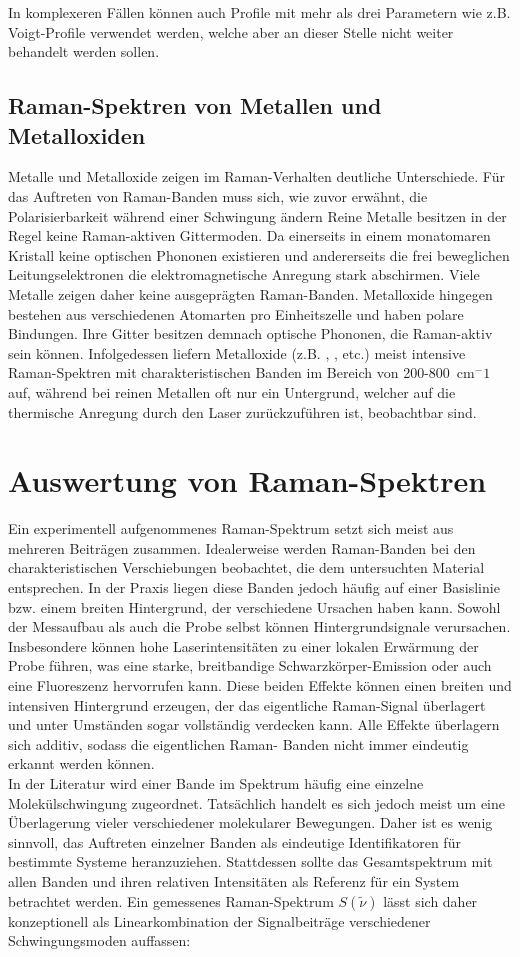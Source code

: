 In komplexeren Fällen können auch Profile mit mehr als drei Parametern wie z.B. Voigt-Profile verwendet werden, welche aber an dieser Stelle nicht weiter behandelt werden sollen.


\subsection{Raman-Spektren von Metallen und Metalloxiden}

Metalle und Metalloxide zeigen im Raman-Verhalten deutliche Unterschiede. Für das Auftreten von Raman-Banden muss sich, wie zuvor erwähnt, die Polarisierbarkeit während einer Schwingung ändern
Reine Metalle besitzen in der Regel keine Raman-aktiven Gittermoden. Da einerseits in einem monatomaren Kristall keine optischen Phononen existieren und andererseits die frei beweglichen 
Leitungselektronen die elektromagnetische Anregung stark abschirmen.
Viele Metalle zeigen daher keine ausgeprägten Raman-Banden. Metalloxide hingegen bestehen aus verschiedenen Atomarten pro Einheitszelle und haben polare Bindungen. Ihre Gitter besitzen demnach 
optische Phononen, die Raman-aktiv sein können. Infolgedessen liefern Metalloxide (z.B. , ,  etc.) meist intensive Raman-Spektren mit 
charakteristischen Banden im Bereich von 200-800~cm$^-1$ auf, während bei reinen Metallen oft nur ein Untergrund, welcher auf die thermische Anregung durch den Laser zurückzuführen ist, beobachtbar sind.
\clearpage
\section{Auswertung von Raman-Spektren}\label{sec:analysis}
Ein experimentell aufgenommenes Raman-Spektrum setzt sich meist aus mehreren Beiträgen zusammen. Idealerweise werden Raman-Banden bei den charakteristischen Verschiebungen beobachtet, die 
dem untersuchten Material entsprechen. In der Praxis liegen diese Banden jedoch häufig auf einer Basislinie bzw. einem breiten Hintergrund, der verschiedene Ursachen haben kann. Sowohl 
der Messaufbau als auch die Probe selbst können Hintergrundsignale verursachen. Insbesondere können hohe Laserintensitäten zu einer lokalen Erwärmung der Probe führen, was eine starke, 
breitbandige Schwarzkörper-Emission oder auch eine  Fluoreszenz hervorrufen kann. Diese beiden Effekte können einen breiten und intensiven Hintergrund erzeugen, der das eigentliche 
Raman-Signal überlagert und unter Umständen sogar vollständig verdecken kann. Alle Effekte überlagern sich additiv, sodass die eigentlichen Raman-
Banden nicht immer eindeutig erkannt werden können.\\
In der Literatur wird einer Bande im Spektrum häufig eine einzelne Molekülschwingung zugeordnet. Tatsächlich handelt es sich jedoch meist um eine Überlagerung vieler verschiedener
molekularer Bewegungen. Daher ist es wenig sinnvoll, das Auftreten einzelner Banden als eindeutige Identifikatoren für bestimmte Systeme heranzuziehen. Stattdessen sollte das 
Gesamtspektrum mit allen Banden und ihren relativen Intensitäten als Referenz für ein System betrachtet werden. Ein gemessenes Raman-Spektrum $S(\tilde{\nu})$ lässt sich daher 
konzeptionell als Linearkombination der Signalbeiträge verschiedener Schwingungsmoden auffassen:

